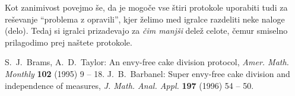 \documentclass[a4paper,12pt]{article}
\begin{document}
 Kot zanimivost povejmo še, da je mogoče vse štiri protokole uporabiti tudi za reševanje ``problema z opravili'', kjer želimo med igralce razdeliti neke naloge (delo). Tedaj si igralci prizadevajo za {\em čim manjši} delež celote, čemur smiselno prilagodimo prej naštete protokole.


\begin{thebibliography}{5}
S.~J.~Brams, A.~D.~Taylor: An envy-free cake division protocol, \emph{Amer. Math. Monthly} \textbf{102} (1995) 9 -- 18.
J.~B.~Barbanel: Super envy-free cake division and independence of measures, \emph{J. Math. Anal. Appl.} \textbf{197} (1996) 54 -- 50.
\end{thebibliography}
\end{document}
